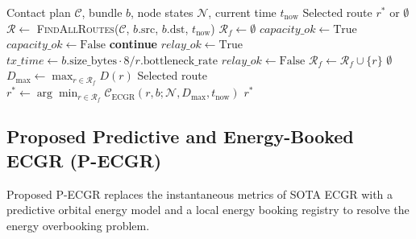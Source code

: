 \documentclass[journal,twocolumn]{IEEEtran}
\newcommand{\ecgr}{\textsf{ECGR}}
\newcommand{\pecgr}{\textsf{P-ECGR}}
\begin{document}
\begin{algorithm}[h]
\caption{SOTA \ecgr{} Route Selection}
\label{alg:sota_ecgr}
\begin{algorithmic}[1]
\REQUIRE Contact plan $\mathcal{C}$, bundle $b$, node states $\mathcal{N}$, current time $t_{\text{now}}$
\ENSURE Selected route $r^*$ or $\emptyset$
\STATE $\mathcal{R} \leftarrow$ \textsc{FindAllRoutes}($\mathcal{C}$, $b.\text{src}$, $b.\text{dst}$, $t_{\text{now}}$)
\STATE $\mathcal{R}_f \leftarrow \emptyset$
    \STATE $capacity\_ok \leftarrow \text{True}$
            \STATE $capacity\_ok \leftarrow \text{False}$
        \ENDIF
    \ENDFOR
        \STATE \textbf{continue}
    \ENDIF
    \STATE $relay\_ok \leftarrow \text{True}$
        \STATE $tx\_time \leftarrow b.\text{size\_bytes} \cdot 8 / r.\text{bottleneck\_rate}$
            \STATE $relay\_ok \leftarrow \text{False}$
        \ENDIF
    \ENDFOR
        \STATE $\mathcal{R}_f \leftarrow \mathcal{R}_f \cup \{r\}$
    \ENDIF
\ENDFOR
{}
    \RETURN $\emptyset$
\ENDIF
\STATE $D_{\max} \leftarrow \max_{r \in \mathcal{R}_f} D(r)$
\STATE Selected route $r^* \leftarrow \arg\min_{r \in \mathcal{R}_f} \mathcal{C}_{\text{ECGR}}(r, b; \mathcal{N}, D_{\max}, t_{\text{now}})$
\RETURN $r^*$
\end{algorithmic}
\end{algorithm}

\subsection{Proposed Predictive and Energy-Booked ECGR (P-ECGR)}
Proposed \pecgr{} replaces the instantaneous metrics of SOTA \ecgr{} with a predictive orbital energy model and a local energy booking registry to resolve the energy overbooking problem.
\end{document}
